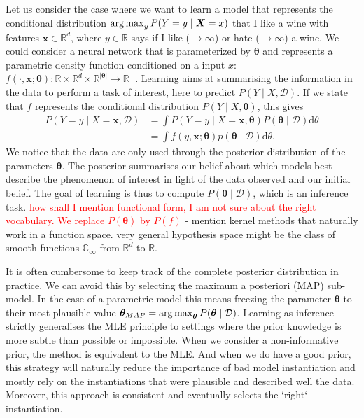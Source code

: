 Let us consider the case where we want to learn a model that represents the conditional distribution $\operatorname*{arg\,max}_y P(Y=y\mid\bm X=x)$ that I like a wine with features $\bm x \in \mathbb{R}^d$, where $y \in \mathbb{R}$ says if I like ($\rightarrow \infty$) or hate ($\rightarrow \infty$) a wine. We could consider a neural network that is parameterized by $\bm \theta$ and represents a parametric density function conditioned on a input $x$: $f(\cdot, \bm x;\bm \theta): \mathbb{R} \times \mathbb{R}^{d} \times \mathbb{R}^{\lvert\bm \theta\rvert} \rightarrow \mathbb{R}^+$.
Learning aims at summarising the information in the data to perform a task of interest, here to predict $P(Y \mid X, \mathcal{D})$.
If we state that $f$ represents the conditional distribution $P(Y\mid X, \bm \theta)$, this gives
\begin{align}
  P(Y=y\mid X=\bm x, \mathcal{D}) &= \int P(Y=y\mid X=\bm x, \bm \theta) P(\bm \theta \mid \mathcal{D}) \text{d}\theta\\
  &=\int f(y, \bm x;\bm \theta) p(\bm \theta \mid  \mathcal{D}) \text{d}\theta.
\end{align}
We notice that the data are only used through the posterior distribution of the parameters $\bm \theta$. The posterior summarises our belief about which models best describe the phenomenon of interest in light of the data observed and our initial belief. The goal of learning is thus to compute $P(\bm \theta \mid \mathcal{D})$, which is an inference task. \textcolor{red}{how shall I mention functional form, I am not sure about the right vocabulary. We replace $P(\bm \theta)$ by $P(f)$} - mention kernel methods that naturally work in a function space.  very general hypothesis space might be the class of smooth functions $\mathbb{C}_\infty$ from $\mathbb{R}^d$ to $\mathbb{R}$.

It is often cumbersome to keep track of the complete posterior distribution in practice. We can avoid this by selecting the maximum a posteriori (MAP) sub-model. In the case of a parametric model this means freezing the parameter $\bm \theta$ to their most plausible value $\bm \theta_{MAP} = \operatorname*{arg\,max}_{\bm \theta} P(\bm \theta \mid \mathcal{D})$. Learning as inference strictly generalises the MLE principle to settings where the prior knowledge is more subtle than possible or impossible. When we consider a non-informative prior, the method is equivalent to the MLE. And when we do have a good prior, this strategy will naturally reduce the importance of bad model instantiation and mostly rely on the instantiations that were plausible and described well the data. Moreover, this approach is consistent and eventually selects the `right` instantiation.

